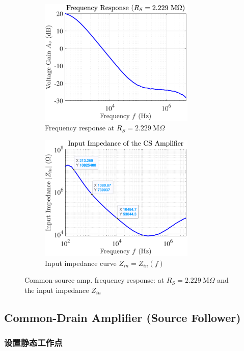 \documentclass[UTF8]{article}
\begin{document}
\begin{figure}[H]\centering
\begin{subfigure}[b]{0.5\columnwidth}\centering
    \includegraphics[width=210pt]{LCE-04-场效应管/assets/cs amp/cs gain, R_S = 2M229.pdf}\hspace*{8mm}
    \caption{Frequency response at $R_S = 2.229 \ \mathrm{M}\Omega$}
\end{subfigure}\hfill
\begin{subfigure}[b]{0.5\columnwidth}\centering
    \includegraphics[width=210pt]{LCE-04-场效应管/assets/cs amp/cs Z_in.pdf}
    \hspace*{8mm}
    \caption{Input impedance curve $Z_{in} = Z_{in}(f)$}
\end{subfigure}
\caption{Common-source amp. frequency response:  at $R_S = 2.229 \ \mathrm{M}\Omega$ and the input impedance $Z_{in}$}
\end{figure}

\subsection{Common-Drain Amplifier (Source Follower)}

\subsubsection{设置静态工作点}
\end{document}
